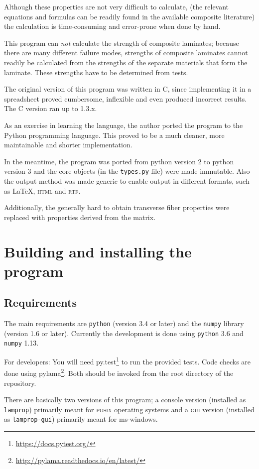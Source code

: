\documentclass[a4paper,landscape,oneside,11pt,twocolumn]{memoir}
\begin{document}
Although these properties are not very difficult to calculate, (the relevant
equations and formulas can be readily found in the available composite
literature) the calculation is time-consuming and error-prone when done by
hand.

This program can \emph{not} calculate the strength of composite laminates;
because there are many different failure modes, strengths of composite
laminates cannot readily be calculated from the strengths of the separate
materials that form the laminate. These strengths have to be determined from
tests.

The original version of this program was written in C, since implementing
it in a spreadsheet proved cumbersome, inflexible and even produced
incorrect results. The C version ran up to 1.3.x.

As an exercise in learning the language, the author ported the program to
the Python programming language. This proved to be a much cleaner, more
maintainable and shorter implementation.

In the meantime, the program was ported from python version 2 to python
version 3 and the core objects (in the \texttt{types.py} file) were made
immutable. Also the output method was made generic to enable output in
different formats, such as \LaTeX, \textsc{html} and \textsc{rtf}.

Additionally, the generally hard to obtain transverse fiber properties
were replaced with properties derived from the matrix.

\chapter{Building and installing the program}

\section{Requirements}

The main requirements are \texttt{python} (version 3.4 or later) and the
\texttt{numpy} library (version 1.6 or later). Currently the development is
done using \texttt{python} 3.6 and \texttt{numpy} 1.13.

For developers: You will need py.test\footnote{\url{https://docs.pytest.org/}}
to run the provided tests. Code checks are done using
pylama\footnote{\url{http://pylama.readthedocs.io/en/latest/}}. Both should be
invoked from the root directory of the repository.

There are basically two versions of this program; a console version (installed
as \texttt{lamprop}) primarily meant for \textsc{posix} operating systems and
a \textsc{gui} version (installed as \texttt{lamprop-gui}) primarily meant for
ms-windows.
\end{document}
